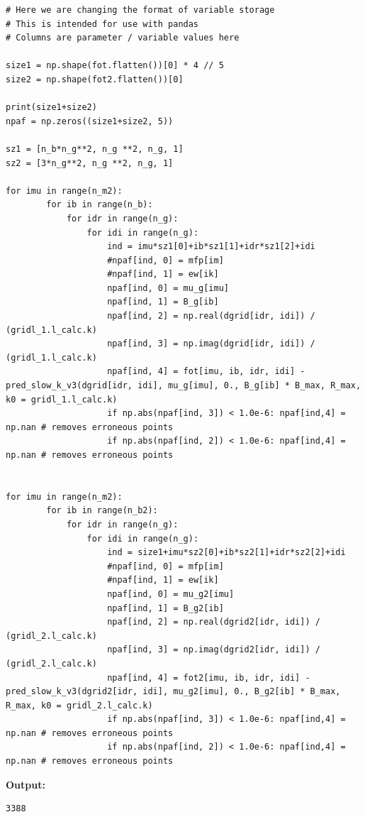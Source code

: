 \documentclass{article}
\begin{document}
\begin{lstlisting}
# Here we are changing the format of variable storage
# This is intended for use with pandas
# Columns are parameter / variable values here

size1 = np.shape(fot.flatten())[0] * 4 // 5
size2 = np.shape(fot2.flatten())[0]

print(size1+size2)
npaf = np.zeros((size1+size2, 5))

sz1 = [n_b*n_g**2, n_g **2, n_g, 1]
sz2 = [3*n_g**2, n_g **2, n_g, 1]

for imu in range(n_m2):
        for ib in range(n_b):
            for idr in range(n_g):
                for idi in range(n_g):
                    ind = imu*sz1[0]+ib*sz1[1]+idr*sz1[2]+idi
                    #npaf[ind, 0] = mfp[im]
                    #npaf[ind, 1] = ew[ik]
                    npaf[ind, 0] = mu_g[imu]
                    npaf[ind, 1] = B_g[ib]
                    npaf[ind, 2] = np.real(dgrid[idr, idi]) / (gridl_1.l_calc.k)
                    npaf[ind, 3] = np.imag(dgrid[idr, idi]) / (gridl_1.l_calc.k)
                    npaf[ind, 4] = fot[imu, ib, idr, idi] - pred_slow_k_v3(dgrid[idr, idi], mu_g[imu], 0., B_g[ib] * B_max, R_max, k0 = gridl_1.l_calc.k)
                    if np.abs(npaf[ind, 3]) < 1.0e-6: npaf[ind,4] = np.nan # removes erroneous points
                    if np.abs(npaf[ind, 2]) < 1.0e-6: npaf[ind,4] = np.nan # removes erroneous points


for imu in range(n_m2):
        for ib in range(n_b2):
            for idr in range(n_g):
                for idi in range(n_g):
                    ind = size1+imu*sz2[0]+ib*sz2[1]+idr*sz2[2]+idi
                    #npaf[ind, 0] = mfp[im]
                    #npaf[ind, 1] = ew[ik]
                    npaf[ind, 0] = mu_g2[imu]
                    npaf[ind, 1] = B_g2[ib]
                    npaf[ind, 2] = np.real(dgrid2[idr, idi]) / (gridl_2.l_calc.k)
                    npaf[ind, 3] = np.imag(dgrid2[idr, idi]) / (gridl_2.l_calc.k)
                    npaf[ind, 4] = fot2[imu, ib, idr, idi] - pred_slow_k_v3(dgrid2[idr, idi], mu_g2[imu], 0., B_g2[ib] * B_max, R_max, k0 = gridl_2.l_calc.k)
                    if np.abs(npaf[ind, 3]) < 1.0e-6: npaf[ind,4] = np.nan # removes erroneous points
                    if np.abs(npaf[ind, 2]) < 1.0e-6: npaf[ind,4] = np.nan # removes erroneous points\end{lstlisting}

\textbf{Output:}\begin{verbatim}
3388

\end{verbatim}
\end{document}
